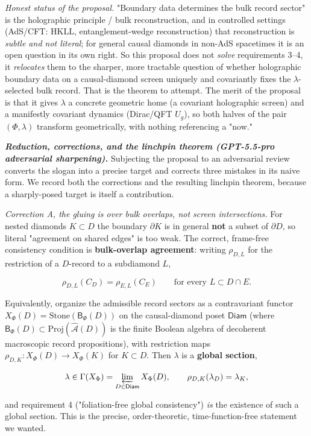 \documentclass[11pt,a4paper]{article}
\begin{document}
\emph{Honest status of the proposal.} "Boundary data determines the bulk record sector" is the holographic principle / bulk reconstruction, and in controlled settings (AdS/CFT: HKLL, entanglement-wedge reconstruction) that reconstruction is \emph{subtle and not literal}; for general causal diamonds in non-AdS spacetimes it is an open question in its own right. So this proposal does not \emph{solve} requirements 3–4, it \emph{relocates} them to the sharper, more tractable question of whether holographic boundary data on a causal-diamond screen uniquely and covariantly fixes the $\lambda$-selected bulk record. That is the theorem to attempt. The merit of the proposal is that it gives $\lambda$ a concrete geometric home (a covariant holographic screen) and a manifestly covariant dynamics (Dirac/QFT $U_g$), so both halves of the pair $(\Phi,\lambda)$ transform geometrically, with nothing referencing a "now."

\emph{\textbf{Reduction, corrections, and the linchpin theorem (GPT-5.5-pro adversarial sharpening).}} Subjecting the proposal to an adversarial review converts the slogan into a precise target and corrects three mistakes in its naive form. We record both the corrections and the resulting linchpin theorem, because a sharply-posed target is itself a contribution.

\emph{Correction A, the gluing is over bulk overlaps, not screen intersections.} For nested diamonds $K \subset D$ the boundary $\partial K$ is in general \textbf{not} a subset of $\partial D$, so literal "agreement on shared edges" is too weak. The correct, frame-free consistency condition is \textbf{bulk-overlap agreement}: writing $\rho_{D,L}$ for the restriction of a $D$-record to a subdiamond $L$,

\[
\rho_{D,L}(C_D) = \rho_{E,L}(C_E) \qquad \text{for every } L \subset D \cap E .
\]

Equivalently, organize the admissible record sectors as a contravariant functor $X_\Phi(D) = \mathrm{Stone}(\mathsf{B}_\Phi(D))$ on the causal-diamond poset $\mathsf{Diam}$ (where $\mathsf{B}_\Phi(D) \subset \mathrm{Proj}(\widehat{\mathcal A}(D))$ is the finite Boolean algebra of decoherent macroscopic record propositions), with restriction maps $\rho_{D,K} : X_\Phi(D) \to X_\Phi(K)$ for $K \subset D$. Then $\lambda$ is a \textbf{global section},

\[
\lambda \in \Gamma(X_\Phi) = \varprojlim_{D \in \mathsf{Diam}} X_\Phi(D), \qquad \rho_{D,K}(\lambda_D) = \lambda_K ,
\]

and requirement 4 ("foliation-free global consistency") \emph{is} the existence of such a global section. This is the precise, order-theoretic, time-function-free statement we wanted.
\end{document}
